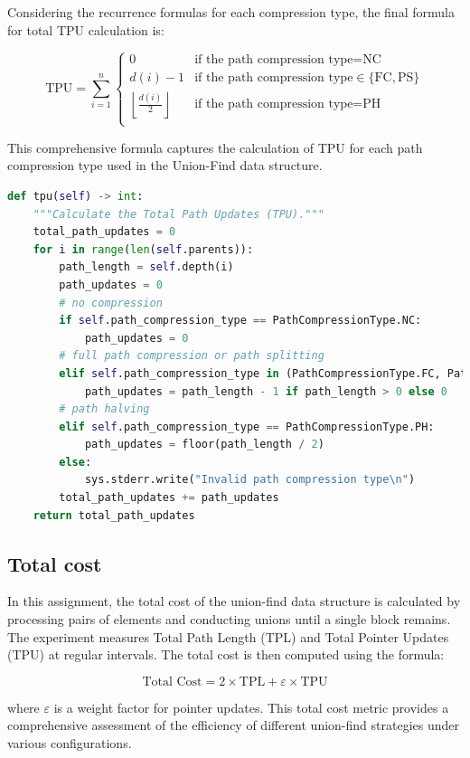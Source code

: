\documentclass[10pt,a4paper,hidelinks]{article}
\begin{document}
Considering the recurrence formulas for each compression type, the final formula for total TPU calculation is:

\[
\text{TPU} = \sum_{i=1}^{n} 
\begin{cases} 
0 & \text{if the path compression type} = \text{NC} \\
d(i) - 1 & \text{if the path compression type} \in \{\text{FC}, \text{PS}\} \\
\left\lfloor \frac{d(i)}{2} \right\rfloor & \text{if the path compression type} = \text{PH} \\
\end{cases}
\]

This comprehensive formula captures the calculation of TPU for each path compression type used in the Union-Find data structure.

\begin{lstlisting}[language=Python, caption=Python implementation of TPU for each compression type]
def tpu(self) -> int:
    """Calculate the Total Path Updates (TPU)."""
    total_path_updates = 0
    for i in range(len(self.parents)):
        path_length = self.depth(i)
        path_updates = 0
        # no compression
        if self.path_compression_type == PathCompressionType.NC:
            path_updates = 0
        # full path compression or path splitting
        elif self.path_compression_type in (PathCompressionType.FC, PathCompressionType.PS):
            path_updates = path_length - 1 if path_length > 0 else 0
        # path halving
        elif self.path_compression_type == PathCompressionType.PH:
            path_updates = floor(path_length / 2)
        else:
            sys.stderr.write("Invalid path compression type\n")
        total_path_updates += path_updates
    return total_path_updates
\end{lstlisting}

\subsection{Total cost}
In this assignment, the total cost of the union-find data structure is calculated by processing pairs of elements and conducting unions until a single block remains. The experiment measures Total Path Length (TPL) and Total Pointer Updates (TPU) at regular intervals. The total cost is then computed using the formula:

$$\text{Total Cost} = 2 \times \text{TPL} + \varepsilon \times \text{TPU}$$

where $\varepsilon$ is a weight factor for pointer updates. This total cost metric provides a comprehensive assessment of the efficiency of different union-find strategies under various configurations.
\end{document}
